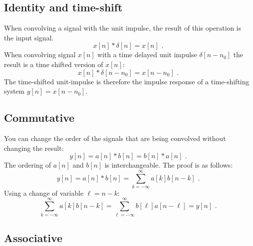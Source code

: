 \subsection{Identity and time-shift}

When convolving a signal with the unit impulse, the result of this
operation is the input signal.
\begin{equation}
x[n]*\delta[n]=x[n]\,\,.
\end{equation}
When convolving signal $x[n]$ with a time delayed unit impulse
$\delta[n-n_0]$ the result is a time shifted version of $x[n]$:
\begin{equation}
x[n]*\delta[n-n_0]=x[n-n_0]\,\,.
\end{equation}
The time-shifted unit-impulse is therefore the impulse response of a
time-shifting system $y[n] = x[n-n_0]$.

\subsection{Commutative}

You can change the order of the signals that are being convolved without changing the result: 
\begin{equation}
y[n] = a[n]*b[n] = b[n]*a[n]\,\,.
\end{equation}
The ordering of $a[n]$ and $b[n]$ is interchangeable. The proof is as follows:
\begin{equation}
y[n] = a[n]*b[n] = \sum_{k=-\infty}^{\infty} a[k]b[n-k]\,\,. 
\end{equation}
Using a change of variable $\ell=n-k$:
\begin{equation}
  \sum_{k=-\infty}^{\infty} a[k]b[n-k] = \sum_{\ell=-\infty}^{\infty} b[\ell] a[n-\ell] = y[n]\,\,.
  \label{eq:commutative_convolution_proof}
\end{equation}

\subsection{Associative}

